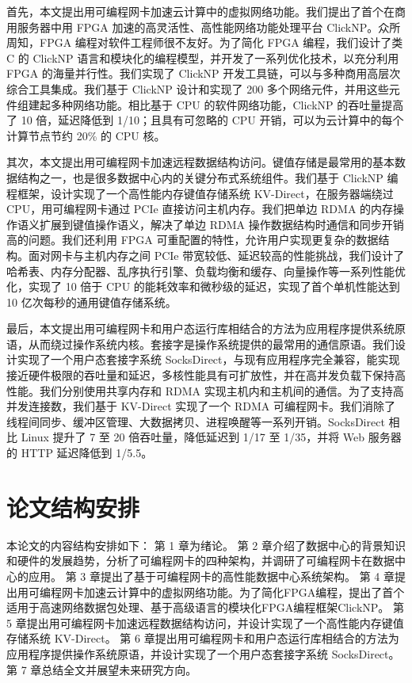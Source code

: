 首先，本文提出用可编程网卡加速云计算中的虚拟网络功能。我们提出了首个在商用服务器中用 FPGA 加速的高灵活性、高性能网络功能处理平台 ClickNP。众所周知，FPGA 编程对软件工程师很不友好。为了简化 FPGA 编程，我们设计了类 C 的 ClickNP 语言和模块化的编程模型，并开发了一系列优化技术，以充分利用 FPGA 的海量并行性。我们实现了 ClickNP 开发工具链，可以与多种商用高层次综合工具集成。我们基于 ClickNP 设计和实现了 200 多个网络元件，并用这些元件组建起多种网络功能。相比基于 CPU 的软件网络功能，ClickNP 的吞吐量提高了 10 倍，延迟降低到 1/10；且具有可忽略的 CPU 开销，可以为云计算中的每个计算节点节约 20\% 的 CPU 核。

其次，本文提出用可编程网卡加速远程数据结构访问。键值存储是最常用的基本数据结构之一，也是很多数据中心内的关键分布式系统组件。我们基于 ClickNP 编程框架，设计实现了一个高性能内存键值存储系统 KV-Direct，在服务器端绕过 CPU，用可编程网卡通过 PCIe 直接访问主机内存。我们把单边 RDMA 的内存操作语义扩展到键值操作语义，解决了单边 RDMA 操作数据结构时通信和同步开销高的问题。我们还利用 FPGA 可重配置的特性，允许用户实现更复杂的数据结构。面对网卡与主机内存之间 PCIe 带宽较低、延迟较高的性能挑战，我们设计了哈希表、内存分配器、乱序执行引擎、负载均衡和缓存、向量操作等一系列性能优化，实现了 10 倍于 CPU 的能耗效率和微秒级的延迟，实现了首个单机性能达到 10 亿次每秒的通用键值存储系统。

最后，本文提出用可编程网卡和用户态运行库相结合的方法为应用程序提供系统原语，从而绕过操作系统内核。套接字是操作系统提供的最常用的通信原语。我们设计实现了一个用户态套接字系统 SocksDirect，与现有应用程序完全兼容，能实现接近硬件极限的吞吐量和延迟，多核性能具有可扩放性，并在高并发负载下保持高性能。我们分别使用共享内存和 RDMA 实现主机内和主机间的通信。为了支持高并发连接数，我们基于 KV-Direct 实现了一个 RDMA 可编程网卡。我们消除了线程间同步、缓冲区管理、大数据拷贝、进程唤醒等一系列开销。SocksDirect 相比 Linux 提升了 7 至 20 倍吞吐量，降低延迟到 1/17 至 1/35，并将 Web 服务器的 HTTP 延迟降低到 1/5.5。


\section{论文结构安排}

本论文的内容结构安排如下：
第 1 章为绪论。
第 2 章介绍了数据中心的背景知识和硬件的发展趋势，分析了可编程网卡的四种架构，并调研了可编程网卡在数据中心的应用。
第 3 章提出了基于可编程网卡的高性能数据中心系统架构。
第 4 章提出用可编程网卡加速云计算中的虚拟网络功能。为了简化FPGA编程，提出了首个适用于高速网络数据包处理、基于高级语言的模块化FPGA编程框架ClickNP。
第 5 章提出用可编程网卡加速远程数据结构访问，并设计实现了一个高性能内存键值存储系统 KV-Direct。
第 6 章提出用可编程网卡和用户态运行库相结合的方法为应用程序提供操作系统原语，并设计实现了一个用户态套接字系统 SocksDirect。
第 7 章总结全文并展望未来研究方向。